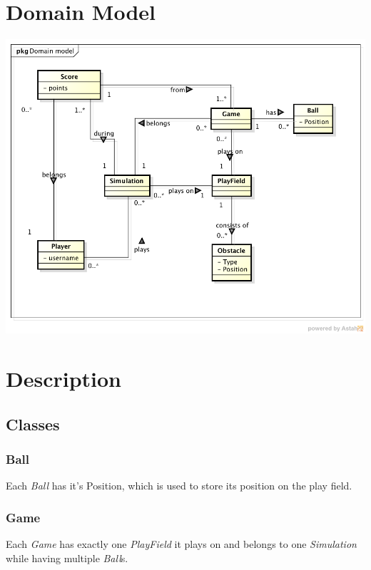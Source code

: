 \documentclass[fontsize=12pt,
               paper=a4,
               twoside=false,
               parskip=half,
               ]{scrartcl}
\begin{document}
\newcommand{\doctitle}{Domain Model}


\tableofcontents

\section{Domain Model}

\includegraphics[width=16cm]{./img/domain-model.png}

\section{Description}

\subsection{Classes}

\subsubsection{Ball}
Each \emph{Ball} has it's Position, which is used to store its position on the play field.

\subsubsection{Game}
Each \emph{Game} has exactly one \emph{PlayField} it plays on and belongs to one \emph{Simulation} while having multiple \emph{Ball}s. 
\end{document}
